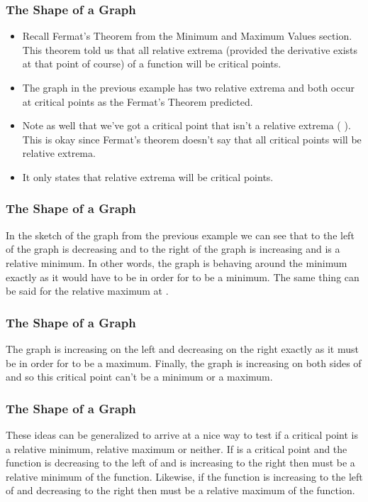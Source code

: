 \documentclass{beamer}
\begin{document}
\begin{frame} 
	\frametitle{The Shape of a Graph}
	\begin{itemize}
\item Recall Fermat’s Theorem from the Minimum and Maximum Values section.  This theorem told us that all relative extrema (provided the derivative exists at that point of course) of a function will be critical points.\item  The graph in the previous example has two relative extrema and both occur at critical points as the Fermat’s Theorem predicted. \item Note as well that we’ve got a critical point that isn’t a relative extrema (  ).  This is okay since Fermat’s theorem doesn’t say that all critical points will be relative extrema. \item  It only states that relative extrema will be critical points.
	\end{itemize}

\end{frame}
\begin{frame} 
	\frametitle{The Shape of a Graph}
In the sketch of the graph from the previous example we can see that to the left of  the graph is decreasing and to the right of  the graph is increasing and  is a relative minimum.  In other words, the graph is behaving around the minimum exactly as it would have to be in order for  to be a minimum.  The same thing can be said for the relative maximum at .  
\end{frame}
\begin{frame} 
	\frametitle{The Shape of a Graph}
	The graph is increasing on the left and decreasing on the right exactly as it must be in order for  to be a maximum.  Finally, the graph is increasing on both sides of  and so this critical point can’t be a minimum or a maximum.
\end{frame}
\begin{frame} 
	\frametitle{The Shape of a Graph}
These ideas can be generalized to arrive at a nice way to test if a critical point is a relative minimum, relative maximum or neither.  If  is a critical point and the function is decreasing to the left of  and is increasing to the right then  must be a relative minimum of the function.  Likewise, if the function is increasing to the left of  and decreasing to the right then  must be a relative maximum of the function.  
\end{frame}
\end{document}
